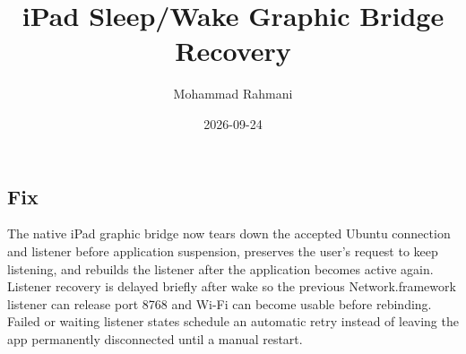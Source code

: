 \documentclass[a4paper]{article}
\title{iPad Sleep/Wake Graphic Bridge Recovery}
\date{2026-09-24}
\author{Mohammad Rahmani}
\begin{document}
   \maketitle

   \begin{preview}
      \section{Fix}
      The native iPad graphic bridge now tears down the accepted Ubuntu connection and listener before application suspension, preserves the user's request to keep listening, and rebuilds the listener after the application becomes active again. Listener recovery is delayed briefly after wake so the previous Network.framework listener can release port 8768 and Wi-Fi can become usable before rebinding. Failed or waiting listener states schedule an automatic retry instead of leaving the app permanently disconnected until a manual restart.
   \end{preview}

   
   
\end{document}
